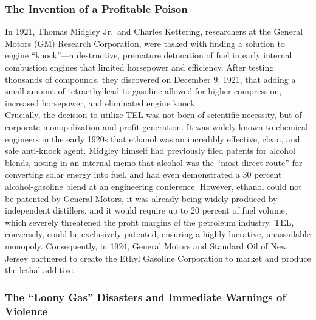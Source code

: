 \documentclass[
]{article}
\begin{document}
\subsubsection{\texorpdfstring{\textbf{The Invention of a Profitable
Poison}}{The Invention of a Profitable Poison}}\label{the-invention-of-a-profitable-poison}

In 1921, Thomas Midgley Jr.~and Charles Kettering, researchers at the
General Motors (GM) Research Corporation, were tasked with finding a
solution to engine ``knock''---a destructive, premature detonation of
fuel in early internal combustion engines that limited horsepower and
efficiency. After testing thousands of compounds, they discovered on
December 9, 1921, that adding a small amount of tetraethyllead to
gasoline allowed for higher compression, increased horsepower, and
eliminated engine knock.\\
Crucially, the decision to utilize TEL was not born of scientific
necessity, but of corporate monopolization and profit generation. It was
widely known to chemical engineers in the early 1920s that ethanol was
an incredibly effective, clean, and safe anti-knock agent. Midgley
himself had previously filed patents for alcohol blends, noting in an
internal memo that alcohol was the ``most direct route'' for converting
solar energy into fuel, and had even demonstrated a 30 percent
alcohol-gasoline blend at an engineering conference. However, ethanol
could not be patented by General Motors, it was already being widely
produced by independent distillers, and it would require up to 20
percent of fuel volume, which severely threatened the profit margins of
the petroleum industry. TEL, conversely, could be exclusively patented,
ensuring a highly lucrative, unassailable monopoly. Consequently, in
1924, General Motors and Standard Oil of New Jersey partnered to create
the Ethyl Gasoline Corporation to market and produce the lethal
additive.

\subsubsection{\texorpdfstring{\textbf{The ``Loony Gas'' Disasters and
Immediate Warnings of
Violence}}{The ``Loony Gas'' Disasters and Immediate Warnings of Violence}}\label{the-loony-gas-disasters-and-immediate-warnings-of-violence}
\end{document}
